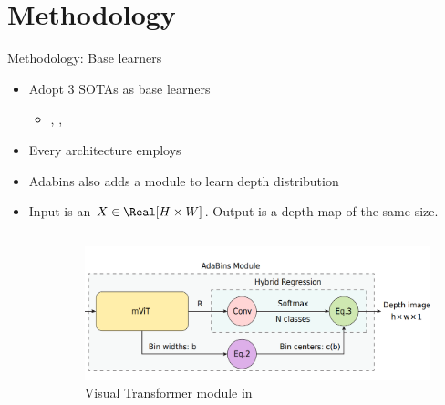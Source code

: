 \documentclass{cubeamer}
\begin{document}
\section{Methodology}
\begin{frame}{Methodology: Base learners}
\begin{itemize}
    \item Adopt 3 SOTAs as base learners
    \begin{itemize}
        \item {} \cite{adabins},  \cite{bts},  \cite{lapdepth}
    \end{itemize}
    \item Every architecture employs 
    \item Adabins also adds a  module to learn depth distribution
    \item Input is an  $X \in \Real[H \times W]$. Output is a depth map of the same size.
    
    \vspace{0.2cm}
    \begin{columns}
        \begin{column}{0.5\textwidth}
            \begin{center}
                
            \end{center}
        \end{column}
        \begin{column}{0.5\textwidth}
            \begin{center}
                \begin{figure}
                    \centering
                    \includegraphics[width=1.0\columnwidth]{figures/adabins.png}
                    \caption{Visual Transformer module in \cite{adabins}}
                \end{figure}
            \end{center}
        \end{column}
    \end{columns}
\end{itemize}
\end{frame}
\end{document}
